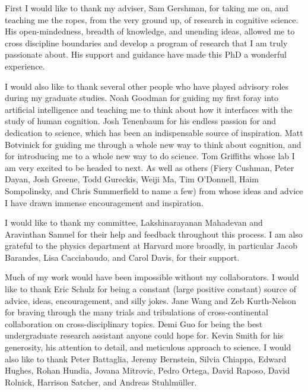 

First I would like to thank my adviser, Sam Gershman, for taking me on, and teaching me the ropes, from the very ground up, of research in cognitive science. His open-mindedness, breadth of knowledge, and unending ideas, allowed me to cross discipline boundaries and develop a program of research that I am truly passionate about. His support and guidance have made this PhD a wonderful experience.

I would also like to thank several other people who have played advisory roles during my graduate studies. Noah Goodman for guiding my first foray into artificial intelligence and teaching me to think about how it interfaces with the study of human cognition. Josh Tenenbaum for his endless passion for and dedication to science, which has been an indispensable source of inspiration. Matt Botvinick for guiding me through a whole new way to think about cognition, and for introducing me to a whole new way to do science. Tom Griffiths whose lab I am very excited to be headed to next. As well as others (Fiery Cushman, Peter Dayan, Josh Greene, Todd Gureckis, Weiji Ma, Tim O'Donnell, Haim Sompolinsky, and Chris Summerfield to name a few) from whose ideas and advice I have drawn immense encouragement and inspiration.

I would like to thank my committee, Lakshinarayanan Mahadevan and Aravinthan Samuel for their help and feedback throughout this process. I am also grateful to the physics department at Harvard more broadly, in particular Jacob Barandes, Lisa Cacciabaudo, and Carol Davis, for their support.

Much of my work would have been impossible without my collaborators. I would like to thank Eric Schulz for being a constant (large positive constant) source of advice, ideas, encouragement, and silly jokes. Jane Wang and Zeb Kurth-Nelson for braving through the many trials and tribulations of cross-continental collaboration on cross-disciplinary topics. Demi Guo for being the best undergraduate research assistant anyone could hope for. Kevin Smith for his generosity, his attention to detail, and meticulous approach to science. I would also like to thank Peter Battaglia, Jeremy Bernstein, Silvia Chiappa, Edward Hughes, Rohan Hundia,  Jovana Mitrovic, Pedro Ortega, David Raposo, David Rolnick, Harrison Satcher, and Andreas Stuhlmüller.

